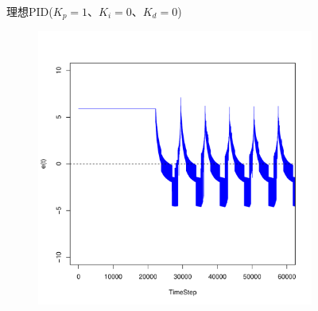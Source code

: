 \documentclass[a4j]{ujarticle}
\begin{document}
\begin{figure}[htbp]
\begin{subfigure}{0.49\hsize}
   \label{subfig:scenario_5_stateBreakdown_86400_345600_0130900-pideal}
 \end{subfigure}
 \caption{理想PID($K_p = 1、K_i = 0、K_d = 0$)}
 \label{fig:result_pid_ideal_1_0_0_0}

\end{figure}

\begin{figure}[htbp]
 \centering
 \begin{subfigure}{0.49\hsize}
   \centering
   \includegraphics[width=1.0\hsize]{scenario_5_e_86400_345600_5_0_0_0_ideal.pdf}
   \label{subfig:scenario_5_e_86400_345600_0-318_5_0_0_0_ideal}
 \end{subfigure}
 \begin{subfigure}{0.49\hsize}
   \centering

\end{subfigure}
\end{figure}
\end{document}
